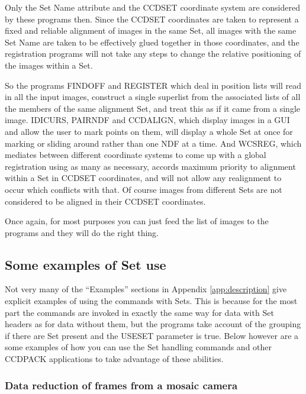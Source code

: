 \documentclass[twoside,11pt]{article}
\renewcommand{\_}{\texttt{\symbol{95}}}
\newcommand{\routine}[1]{{\sc #1}}
\begin{document}
Only the Set Name attribute and the CCD\_SET coordinate system
are considered by these programs then.
Since the CCD\_SET coordinates are taken to represent 
a fixed and reliable alignment of images in the same Set,
all images with the same Set Name are taken to be effectively 
glued together in those coordinates, and the registration programs
will not take any steps to change the relative positioning of 
the images within a Set.  

So the programs 
\routine{FINDOFF} and \routine{REGISTER} which deal in position lists
will read in all the input images, construct a single superlist from
the associated lists of 
all the members of the same alignment Set, and treat this as if
it came from a single image.
\routine{IDICURS}, \routine{PAIRNDF} and \routine{CCDALIGN}, 
which display images in a GUI and allow the user to mark points on them,
will display a whole Set at once for marking or sliding around
rather than one NDF at a time.
And \routine{WCSREG}, which mediates between different coordinate
systems to come up with a global registration using as many as necessary,
accords maximum priority to alignment within a Set in CCD\_SET 
coordinates, and will not allow any realignment to occur which conflicts
with that.
Of course images from different Sets are not considered to be aligned
in their CCD\_SET coordinates.

Once again, for most purposes you can just feed the list of 
images to the programs and they will do the right thing.

\subsection{Some examples of Set use}

Not very many of the ``Examples'' sections in Appendix 
\ref{app:description} give explicit examples of using the commands
with Sets.
This is because for the most part the commands are invoked in 
exactly the same way for data with Set headers as for data without them,
but the programs take account of the grouping if there are Set present
and the USESET parameter is true.
Below however are a some examples of how you can use the Set handling
commands and other CCDPACK applications to take advantage of these
abilities.

\subsubsection{Data reduction of frames from a mosaic camera}
\end{document}
